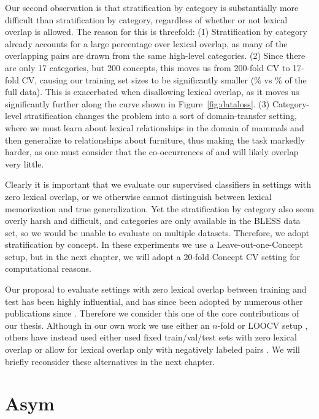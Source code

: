 Our second observation is that stratification by category is substantially
more difficult than stratification by category, regardless of whether or
not lexical overlap is allowed. The reason for this is threefold:
(1) Stratification by category already accounts for a large percentage over
lexical overlap, as many of the overlapping pairs are drawn from the same
high-level categories. (2) Since there are only 17 categories, but 200 concepts,
this moves us from 200-fold CV to 17-fold CV, causing our training set sizes
to be significantly smaller (\% vs \% of the full
data). This is exacerbated when disallowing lexical overlap, as it moves us
significantly further along the curve shown in Figure~\ref{fig:dataloss}.
(3) Category-level stratification changes the problem into a sort of
domain-transfer setting, where we must learn about lexical relationships in
the domain of mammals and then generalize to relationships about
furniture, thus making the task markedly harder, as one must consider
that the co-occurrences of  and  will likely overlap
very little.

Clearly it is important that we evaluate our supervised classifiers in
settings with zero lexical overlap, or we otherwise cannot distinguish between
lexical memorization and true generalization. Yet the stratification by
category also seem overly harsh and difficult, and categories are only available
in the BLESS data set, so we would be unable to evaluate on multiple datasets.
Therefore, we adopt stratification by concept. In these experiments we use a
Leave-out-one-Concept setup, but in the next chapter, we will adopt a
20-fold Concept CV setting for computational reasons.

Our proposal to evaluate settings with zero lexical overlap between training
and test has been highly influential, and has since been adopted by numerous
other publications since
\cite{levy:2015:naacl,kruszewski:2015:tacl,roller:2016:emnlp,shwartz:2016:acl,vylomova:2016:acl}.
Therefore we consider this one of the core contributions of our thesis.
Although in our own work we use either an $n$-fold \cite{roller:2016:emnlp} or
LOOCV setup \cite{roller:2014:coling}, others have instead used either used
fixed train/val/test sets with zero lexical overlap
\cite{levy:2015:naacl,shwartz:2016:acl,vylomova:2016:acl} or allow for lexical
overlap only with negatively labeled pairs \cite{kruszewski:2015:tacl}. We
will briefly reconsider these alternatives in the next chapter.

\section{Asym}

